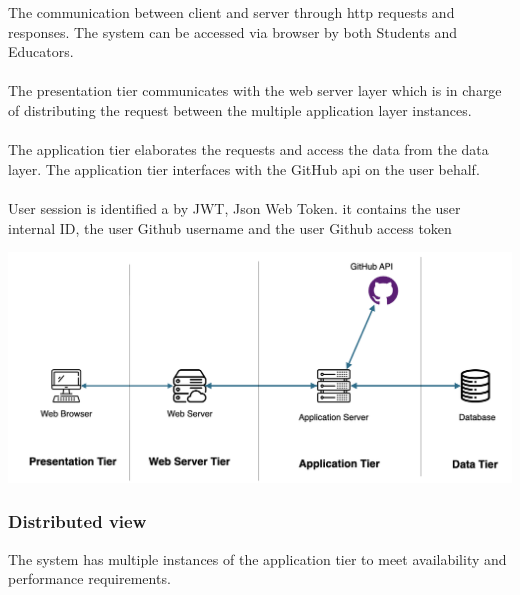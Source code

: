 \documentclass{article}
\begin{document}
The communication between client and server through http requests and responses.
The system can be accessed via browser by both Students and Educators. 
\\\\
The presentation tier communicates with the web server layer which is in charge of distributing the request between the multiple application layer instances. 
\\\\
The application tier elaborates the requests and access the data from the data layer. The application tier interfaces with the GitHub api on the user behalf. 
\\\\
User session is identified a by JWT, Json Web Token. it contains the user internal ID, the user Github username and the user Github access token
\begin{center}
    \includegraphics[width=\linewidth]{hlv2.png}
  \label{fig:hlv2}
\end{center}

\subsubsection{Distributed view}
The system has multiple instances of the application tier to meet availability and performance requirements.
\end{document}
